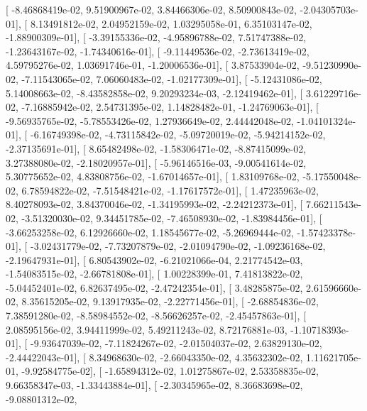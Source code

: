 \documentclass{article}
\begin{document}
       [ -8.46868419e-02,   9.51900967e-02,   3.84466306e-02,
          8.50900843e-02,  -2.04305703e-01],
       [  8.13491812e-02,   2.04952159e-02,   1.03295058e-01,
          6.35103147e-02,  -1.88900309e-01],
       [ -3.39155336e-02,  -4.95896788e-02,   7.51747388e-02,
         -1.23643167e-02,  -1.74340616e-01],
       [ -9.11449536e-02,  -2.73613419e-02,   4.59795276e-02,
          1.03691746e-01,  -1.20006536e-01],
       [  3.87533904e-02,  -9.51230990e-02,  -7.11543065e-02,
          7.06060483e-02,  -1.02177309e-01],
       [ -5.12431086e-02,   5.14008663e-02,  -8.43582858e-02,
          9.20293234e-03,  -2.12419462e-01],
       [  3.61229716e-02,  -7.16885942e-02,   2.54731395e-02,
          1.14828482e-01,  -1.24769063e-01],
       [ -9.56935765e-02,  -5.78553426e-02,   1.27936649e-02,
          2.44442048e-02,  -1.04101324e-01],
       [ -6.16749398e-02,  -4.73115842e-02,  -5.09720019e-02,
         -5.94214152e-02,  -2.37135691e-01],
       [  8.65482498e-02,  -1.58306471e-02,  -8.87415099e-02,
          3.27388080e-02,  -2.18020957e-01],
       [ -5.96146516e-03,  -9.00541614e-02,   5.30775652e-02,
          4.83808756e-02,  -1.67014657e-01],
       [  1.83109768e-02,  -5.17550048e-02,   6.78594822e-02,
         -7.51548421e-02,  -1.17617572e-01],
       [  1.47235963e-02,   8.40278093e-02,   3.84370046e-02,
         -1.34195993e-02,  -2.24212373e-01],
       [  7.66211543e-02,  -3.51320030e-02,   9.34451785e-02,
         -7.46508930e-02,  -1.83984456e-01],
       [ -3.66253258e-02,   6.12926660e-02,   1.18545677e-02,
         -5.26969444e-02,  -1.57423378e-01],
       [ -3.02431779e-02,  -7.73207879e-02,  -2.01094790e-02,
         -1.09236168e-02,  -2.19647931e-01],
       [  6.80543902e-02,  -6.21021066e-04,   2.21774542e-03,
         -1.54083515e-02,  -2.66781808e-01],
       [  1.00228399e-01,   7.41813822e-02,  -5.04452401e-02,
          6.82637495e-02,  -2.47242354e-01],
       [  3.48285875e-02,   2.61596660e-02,   8.35615205e-02,
          9.13917935e-02,  -2.22771456e-01],
       [ -2.68854836e-02,   7.38591280e-02,  -8.58984552e-02,
         -8.56626257e-02,  -2.45457863e-01],
       [  2.08595156e-02,   3.94411999e-02,   5.49211243e-02,
          8.72176881e-03,  -1.10718393e-01],
       [ -9.93647039e-02,  -7.11824267e-02,  -2.01504037e-02,
          2.63829130e-02,  -2.44422043e-01],
       [  8.34968630e-02,  -2.66043350e-02,   4.35632302e-02,
          1.11621705e-01,  -9.92584775e-02],
       [ -1.65894312e-02,   1.01275867e-02,   2.53358835e-02,
          9.66358347e-03,  -1.33443884e-01],
       [ -2.30345965e-02,   8.36683698e-02,  -9.08801312e-02,
\end{document}
